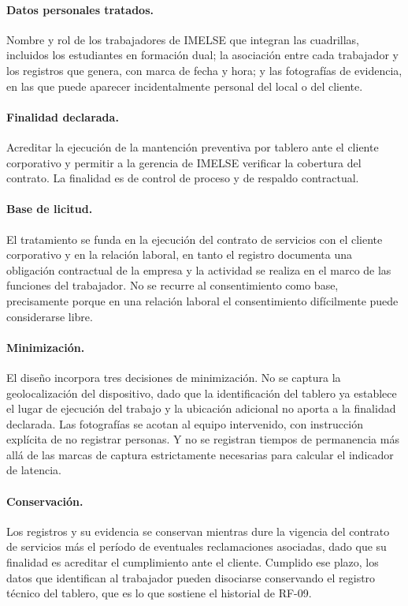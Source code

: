 \documentclass[10pt,letterpaper]{article}
\begin{document}
\paragraph{Datos personales tratados.} Nombre y rol de los trabajadores de IMELSE que
integran las cuadrillas, incluidos los estudiantes en formación dual; la asociación
entre cada trabajador y los registros que genera, con marca de fecha y hora; y las
fotografías de evidencia, en las que puede aparecer incidentalmente personal del local
o del cliente.

\paragraph{Finalidad declarada.} Acreditar la ejecución de la mantención preventiva
por tablero ante el cliente corporativo y permitir a la gerencia de IMELSE verificar
la cobertura del contrato. La finalidad es de control de proceso y de respaldo
contractual.

\paragraph{Base de licitud.} El tratamiento se funda en la ejecución del contrato de
servicios con el cliente corporativo y en la relación laboral, en tanto el registro
documenta una obligación contractual de la empresa y la actividad se realiza en el
marco de las funciones del trabajador. No se recurre al consentimiento como base,
precisamente porque en una relación laboral el consentimiento difícilmente puede
considerarse libre.

\paragraph{Minimización.} El diseño incorpora tres decisiones de minimización. No se
captura la geolocalización del dispositivo, dado que la identificación del tablero ya
establece el lugar de ejecución del trabajo y la ubicación adicional no aporta a la
finalidad declarada. Las fotografías se acotan al equipo intervenido, con instrucción
explícita de no registrar personas. Y no se registran tiempos de permanencia más allá
de las marcas de captura estrictamente necesarias para calcular el indicador de
latencia.

\paragraph{Conservación.} Los registros y su evidencia se conservan mientras dure la
vigencia del contrato de servicios más el período de eventuales reclamaciones
asociadas, dado que su finalidad es acreditar el cumplimiento ante el cliente. Cumplido
ese plazo, los datos que identifican al trabajador pueden disociarse conservando el
registro técnico del tablero, que es lo que sostiene el historial de RF-09.
\end{document}
